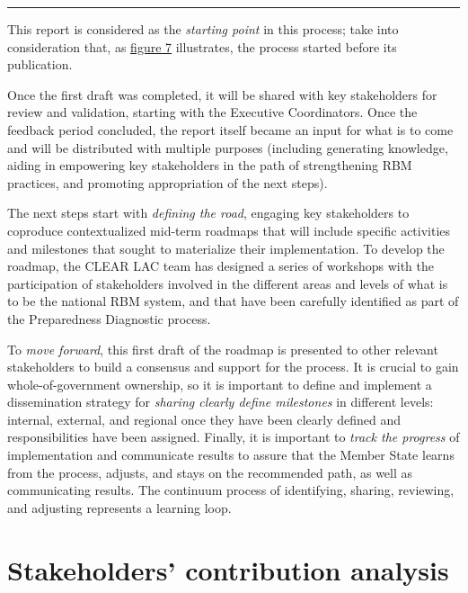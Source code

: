 \documentclass[
  10pt,
]{book}
\begin{document}
\begin{center}\rule{0.5\linewidth}{0.5pt}\end{center}

This report is considered as the \emph{starting point} in this process; take into consideration that, as \protect\hyperlink{fig:figure7}{figure 7} illustrates, the process started before its publication.

Once the first draft was completed, it will be shared with key stakeholders for review and validation, starting with the Executive Coordinators. Once the feedback period concluded, the report itself became an input for what is to come and will be distributed with multiple purposes (including generating knowledge, aiding in empowering key stakeholders in the path of strengthening RBM practices, and promoting appropriation of the next steps).

The next steps start with \emph{defining the road}, engaging key stakeholders to coproduce contextualized mid-term roadmaps that will include specific activities and milestones that sought to materialize their implementation. To develop the roadmap, the CLEAR LAC team has designed a series of workshops with the participation of stakeholders involved in the different areas and levels of what is to be the national RBM system, and that have been carefully identified as part of the Preparedness Diagnostic process.

To \emph{move forward}, this first draft of the roadmap is presented to other relevant stakeholders to build a consensus and support for the process. It is crucial to gain whole-of-government ownership, so it is important to define and implement a dissemination strategy for \emph{sharing clearly define milestones} in different levels: internal, external, and regional once they have been clearly defined and responsibilities have been assigned. Finally, it is important to \emph{track the progress} of implementation and communicate results to assure that the Member State learns from the process, adjusts, and stays on the recommended path, as well as communicating results. The continuum process of identifying, sharing, reviewing, and adjusting represents a learning loop.

\hypertarget{stakeholders-contribution-analysis}{%
\section{Stakeholders' contribution analysis}\label{stakeholders-contribution-analysis}}
\end{document}
